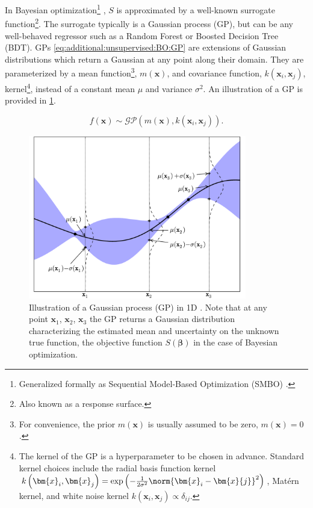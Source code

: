 In Bayesian optimization\footnote{Generalized
formally as Sequential Model-Based Optimization (SMBO) \cite{NIPS2011_4443}.} \cite{Brochu2010,1301.1942,Borisyak,NIPS2011_4443},
$S$ is approximated by a well-known surrogate function\footnote{Also known as a response surface.}.
The surrogate typically is a Gaussian process (GP),
but can be any well-behaved regressor such as
a Random Forest or Boosted Decision Tree (BDT).
GPs \cref{eq:additional:unsupervised:BO:GP} are
extensions of Gaussian distributions which return a Gaussian at any point along their domain.
They are parameterized by a mean function\footnote{For convenience,
the prior $m\left(\bm{x}\right)$ is usually assumed to be zero, $m\left(\bm{x}\right)=0$.}, $m\left(\bm{x}\right)$,
and covariance function, $k\left(\bm{x}_{i}, \bm{x}_{j}\right)$,
\ie kernel\footnote{The kernel of the GP is a hyperparameter to be chosen in advance.
Standard kernel choices include
the radial basis function kernel $k\left(\bm{x}_{i}, \bm{x}_{j}\right) = \exp\left(-\frac{1}{2\sigma^{2}}\norm{\bm{x}_{i}-\bm{x}{j}}^{2}\right)$,
Mat\'{e}rn kernel,
and white noise kernel $k\left(\bm{x}_{i}, \bm{x}_{j}\right) \propto \delta_{ij}$.},
instead of a constant mean $\mu$ and variance $\sigma^{2}$.
An illustration of a GP is provided in \cref{fig:additional:unsupervised:BO:GP_ex}.

\begin{equation}\label{eq:additional:unsupervised:BO:GP}
f\left(\bm{x}\right) \sim \mathcal{GP}\left(m\left(\bm{x}\right), k\left(\bm{x}_{i}, \bm{x}_{j}\right)\right).
\end{equation}

\begin{figure}[H] %
\centering
\includegraphics[width=0.85\textwidth]{figures/ml/gp}
\caption{
Illustration of a Gaussian process (GP) in 1D \cite{Brochu2010}.
Note that at any point $\bm{x}_{1}$, $\bm{x}_{2}$, $\bm{x}_{3}$ the GP
returns a Gaussian distribution characterizing the estimated mean and uncertainty on the
unknown true function, \ie the objective function $S\left(\bm{\beta}\right)$ in the case of Bayesian optimization.
}
\label{fig:additional:unsupervised:BO:GP_ex}
\end{figure}

